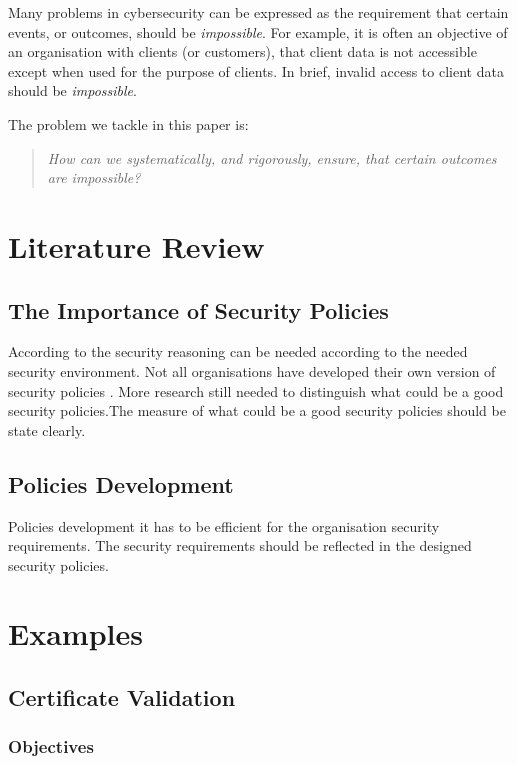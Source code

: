 \documentclass[journal]{IEEEtran}
\begin{document}
Many problems in cybersecurity can be expressed as the requirement that certain
events, or outcomes, should be {\em impossible}.
For example, it is often an objective of an organisation with clients (or
customers), that client data is not accessible except when used for the purpose
of clients. In brief, invalid access to client data should be {\em impossible}.

The problem we tackle in this paper is:
\begin{quote}\em
  How can we systematically, and rigorously, ensure, that
  certain outcomes are impossible?
\end{quote}


\section{Literature Review}

\subsection{The Importance of Security Policies}
According to \cite{glasgow1992logic} the security reasoning can
be needed according to the needed security environment.  Not all
organisations have developed their own version of security policies
\cite{paananen2020state}. More research still needed to distinguish what
could be a good security policies.The measure of what could be a good
security policies should be state clearly.

\subsection{Policies Development}
Policies development it has to be efficient for the organisation security
requirements. The security requirements should be reflected in the
designed security policies.

\section{Examples}

\subsection{Certificate Validation}

\subsubsection{Objectives}
\end{document}
